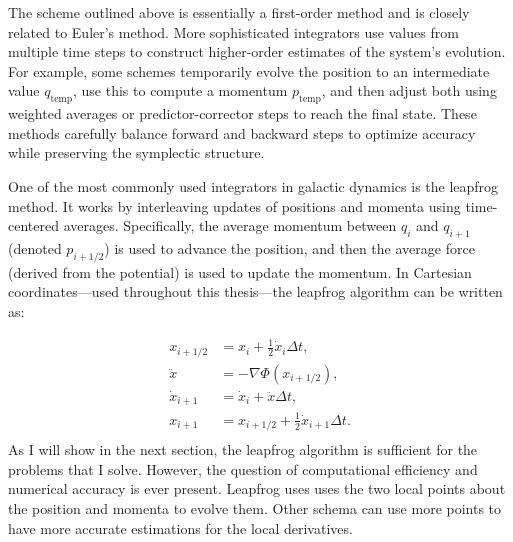     The scheme outlined above is essentially a first-order method and is closely related to Euler's method. More sophisticated integrators use values from multiple time steps to construct higher-order estimates of the system's evolution. For example, some schemes temporarily evolve the position to an intermediate value $q_\mathrm{temp}$, use this to compute a momentum $p_\mathrm{temp}$, and then adjust both using weighted averages or predictor-corrector steps to reach the final state. These methods carefully balance forward and backward steps to optimize accuracy while preserving the symplectic structure.

    One of the most commonly used integrators in galactic dynamics is the leapfrog method. It works by interleaving updates of positions and momenta using time-centered averages. Specifically, the average momentum between $q_i$ and $q_{i+1}$ (denoted $p_{i+1/2}$) is used to advance the position, and then the average force (derived from the potential) is used to update the momentum. In Cartesian coordinates—used throughout this thesis—the leapfrog algorithm can be written as:


    \begin{eqnarray}
        x_{i+1/2} &= x_i + \frac{1}{2} \dot{x}_i \Delta t , \\
        \ddot{x} &= -\nabla \Phi(x_{i+1/2}), \\
        \dot{x}_{i+1} &= \dot{x}_i + \ddot{x} \Delta t, \\
        x_{i+1} &= x_{i+1/2} + \frac{1}{2} \dot{x}_{i+1} \Delta t. \\
    \end{eqnarray}
    As I will show in the next section, the leapfrog algorithm is sufficient for the problems that I solve. However, the question of computational efficiency and numerical accuracy is ever present. Leapfrog uses uses the two local points about the position and momenta to evolve them. Other schema can use more points to have more accurate estimations for the local derivatives. 
    

